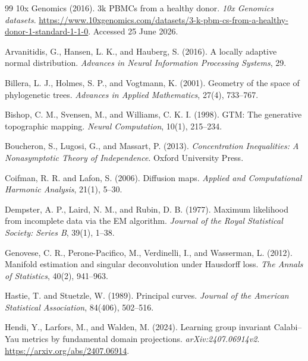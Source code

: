 \begin{thebibliography}{99}
10x Genomics (2016).
3k PBMCs from a healthy donor.
\emph{10x Genomics datasets}.
\url{https://www.10xgenomics.com/datasets/3-k-pbm-cs-from-a-healthy-donor-1-standard-1-1-0}.
Accessed 25 June 2026.

Arvanitidis, G., Hansen, L. K., and Hauberg, S. (2016).
A locally adaptive normal distribution.
\emph{Advances in Neural Information Processing Systems}, 29.

Billera, L. J., Holmes, S. P., and Vogtmann, K. (2001).
Geometry of the space of phylogenetic trees.
\emph{Advances in Applied Mathematics}, 27(4), 733--767.

Bishop, C. M., Svensen, M., and Williams, C. K. I. (1998).
GTM: The generative topographic mapping.
\emph{Neural Computation}, 10(1), 215--234.

Boucheron, S., Lugosi, G., and Massart, P. (2013).
\emph{Concentration Inequalities: A Nonasymptotic Theory of Independence}.
Oxford University Press.

Coifman, R. R. and Lafon, S. (2006).
Diffusion maps.
\emph{Applied and Computational Harmonic Analysis}, 21(1), 5--30.

Dempster, A. P., Laird, N. M., and Rubin, D. B. (1977).
Maximum likelihood from incomplete data via the EM algorithm.
\emph{Journal of the Royal Statistical Society: Series B}, 39(1), 1--38.

Genovese, C. R., Perone-Pacifico, M., Verdinelli, I., and Wasserman, L. (2012).
Manifold estimation and singular deconvolution under Hausdorff loss.
\emph{The Annals of Statistics}, 40(2), 941--963.

Hastie, T. and Stuetzle, W. (1989).
Principal curves.
\emph{Journal of the American Statistical Association}, 84(406), 502--516.

Hendi, Y., Larfors, M., and Walden, M. (2024).
Learning group invariant Calabi--Yau metrics by fundamental domain projections.
\emph{arXiv:2407.06914v2}.
\url{https://arxiv.org/abs/2407.06914}.


\end{thebibliography}
